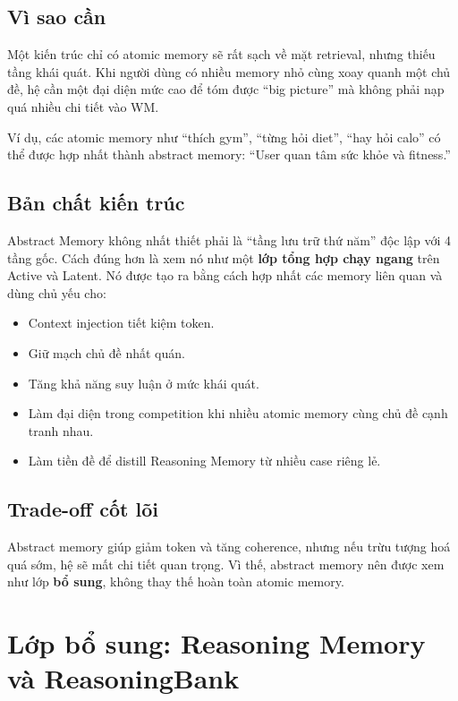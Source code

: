 \documentclass[a4paper,12pt]{article}
\begin{document}
\subsection*{Vì sao cần}

Một kiến trúc chỉ có atomic memory sẽ rất sạch về mặt retrieval, nhưng thiếu tầng khái quát. Khi người dùng có nhiều memory nhỏ cùng xoay quanh một chủ đề, hệ cần một đại diện mức cao để tóm được ``big picture'' mà không phải nạp quá nhiều chi tiết vào WM.

Ví dụ, các atomic memory như ``thích gym'', ``từng hỏi diet'', ``hay hỏi calo'' có thể được hợp nhất thành abstract memory: ``User quan tâm sức khỏe và fitness.''

\subsection*{Bản chất kiến trúc}

Abstract Memory không nhất thiết phải là ``tầng lưu trữ thứ năm'' độc lập với 4 tầng gốc. Cách đúng hơn là xem nó như một \textbf{lớp tổng hợp chạy ngang} trên Active và Latent. Nó được tạo ra bằng cách hợp nhất các memory liên quan và dùng chủ yếu cho:
\begin{itemize}
    \item Context injection tiết kiệm token.
    \item Giữ mạch chủ đề nhất quán.
    \item Tăng khả năng suy luận ở mức khái quát.
    \item Làm đại diện trong competition khi nhiều atomic memory cùng chủ đề cạnh tranh nhau.
    \item Làm tiền đề để distill Reasoning Memory từ nhiều case riêng lẻ.
\end{itemize}

\subsection*{Trade-off cốt lõi}

Abstract memory giúp giảm token và tăng coherence, nhưng nếu trừu tượng hoá quá sớm, hệ sẽ mất chi tiết quan trọng. Vì thế, abstract memory nên được xem như lớp \textbf{bổ sung}, không thay thế hoàn toàn atomic memory.

\section{Lớp bổ sung: Reasoning Memory và ReasoningBank}
\end{document}
